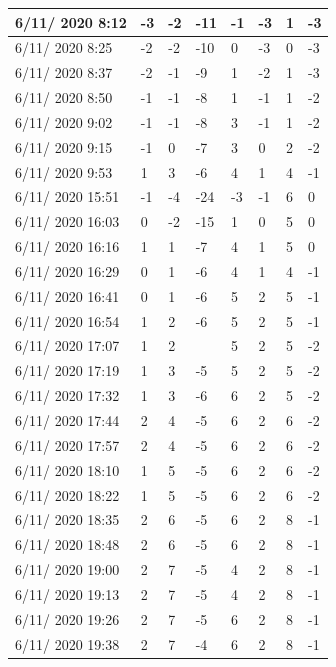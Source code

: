 \begin{table}[h]
\begin{tabular}{|p{3cm}|p{1cm}|p{1cm}|p{1cm}|p{1cm}|p{1cm}|p{1cm}|p{1cm}|}
6/11/ 2020 8:12&	-3&	-2&	-11&-1&	-3&	1&	-3 \\ \hline
6/11/ 2020 8:25&	-2&	-2&	-10&0&	-3&	0&	-3 \\ \hline
6/11/ 2020 8:37&	-2&	-1&	-9&	1&	-2&	1&	-3 \\ \hline
6/11/ 2020 8:50&	-1&	-1&	-8&	1&	-1&	1&	-2 \\ \hline
6/11/ 2020 9:02&	-1&	-1&	-8&	3&	-1&	1&	-2 \\ \hline
6/11/ 2020 9:15&	-1&	0&	-7&	3&	0&	2&	-2 \\ \hline
6/11/ 2020 9:53&	1&	3&	-6&	4&	1&	4&	-1 \\ \hline
6/11/ 2020 15:51&	-1&	-4&	-24&-3&	-1&	6&	0 \\ \hline
6/11/ 2020 16:03&	0&	-2&	-15&1&	0&	5&	0 \\ \hline
6/11/ 2020 16:16&	1&	1&	-7&	4&	1&	5&	0 \\ \hline
6/11/ 2020 16:29&	0&	1&	-6&	4&	1&	4&	-1 \\ \hline
6/11/ 2020 16:41&	0&	1&	-6&	5&	2&	5&	-1 \\ \hline
6/11/ 2020 16:54&	1&	2&	-6&	5&	2&	5&	-1 \\ \hline
6/11/ 2020 17:07&	1&	2&	  &	5&	2&	5&	-2 \\ \hline
6/11/ 2020 17:19&	1&	3&	-5&	5&	2&	5&	-2 \\ \hline
6/11/ 2020 17:32&	1&	3&	-6&	6&	2&	5&	-2 \\ \hline
6/11/ 2020 17:44&	2&	4&	-5&	6&	2&	6&	-2 \\ \hline
6/11/ 2020 17:57&	2&	4&	-5&	6&	2&	6&	-2 \\ \hline
6/11/ 2020 18:10&	1&	5&	-5&	6&	2&	6&	-2 \\ \hline
6/11/ 2020 18:22&	1&	5&	-5&	6&	2&	6&	-2 \\ \hline
6/11/ 2020 18:35&	2&	6&	-5&	6&	2&	8&	-1 \\ \hline
6/11/ 2020 18:48&	2&	6&	-5&	6&	2&	8&	-1 \\ \hline
6/11/ 2020 19:00&	2&	7&	-5&	4&	2&	8&	-1 \\ \hline
6/11/ 2020 19:13&	2&	7&	-5&	4&	2&	8&	-1 \\ \hline
6/11/ 2020 19:26&	2&	7&	-5&	6&	2&	8&	-1 \\ \hline
6/11/ 2020 19:38&	2&	7&	-4&	6&	2&	8&	-1 \\ \hline
    \end{tabular}
\end{table}
